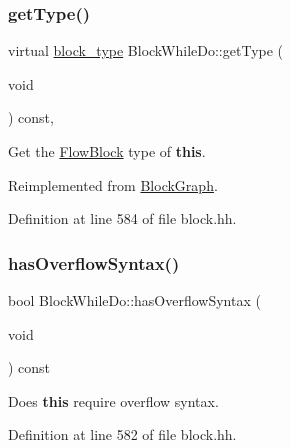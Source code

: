 \subsubsection{\texorpdfstring{getType()}{getType()}}
{\footnotesize\ttfamily virtual \mbox{\hyperlink{class_flow_block_a70df78390870fcdd51e31426ba6a193e}{block\+\_\+type}} Block\+While\+Do\+::get\+Type (\begin{DoxyParamCaption}\item[{void}]{ }\end{DoxyParamCaption}) const\hspace{0.3cm}{\ttfamily [inline]}, {\ttfamily [virtual]}}



Get the \mbox{\hyperlink{class_flow_block}{Flow\+Block}} type of {\bfseries{this}}. 



Reimplemented from \mbox{\hyperlink{class_block_graph_a8e542e109e0acc977218ceaf3c248153}{Block\+Graph}}.



Definition at line 584 of file block.\+hh.

\mbox{\label{class_block_while_do_a3ab5b1bf634b0301449da7366e78f352}} 
\subsubsection{\texorpdfstring{hasOverflowSyntax()}{hasOverflowSyntax()}}
{\footnotesize\ttfamily bool Block\+While\+Do\+::has\+Overflow\+Syntax (\begin{DoxyParamCaption}\item[{void}]{ }\end{DoxyParamCaption}) const\hspace{0.3cm}{\ttfamily [inline]}}



Does {\bfseries{this}} require overflow syntax. 



Definition at line 582 of file block.\+hh.

